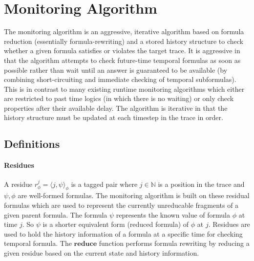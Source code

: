 \documentclass[]{../llncs/llncs}
\newcommand{\rpt}[3]{\ensuremath{\langle #1, #2 \rangle}_{#3}}
\begin{document}





\section{Monitoring Algorithm}
The monitoring algorithm is an aggressive, iterative algorithm based on formula reduction (essentially formula-rewriting) and a stored history structure to check whether a given formula satisfies or violates the target trace. 
It is aggressive in that the algorithm attempts to check future-time temporal formulas as soon as possible rather than wait until an answer is guaranteed to be available (by combining short-circuiting and immediate checking of temporal subformulas).
This is in contrast to many existing runtime monitoring algorithms which either are restricted to past time logics (in which there is no waiting) or only check properties after their available delay. %
The algorithm is iterative in that the history structure must be updated at each timestep in the trace in order. 


\subsection{Definitions}
\paragraph{Residues}
A residue $r^j_{\phi} = \rpt{j}{\psi}{\phi}$ is a tagged pair where $j \in \mathbb{N}$ is a position in the trace and $\psi, \phi$ are well-formed formulas. The monitoring algorithm is built on these residual formulas which are used to represent the currently unreducable fragments of a given parent formula. 
The formula $\psi$ represents the known value of formula $\phi$ at time $j$. So $\psi$ is a shorter equivalent form (reduced formula) of $\phi$ at $j$. 
Residues are used to hold the history information of a formula at a specific time for checking temporal formula.
The $\mathbf{reduce}$ function performs formula rewriting by reducing a given residue based on the current state and history information. 
\end{document}

